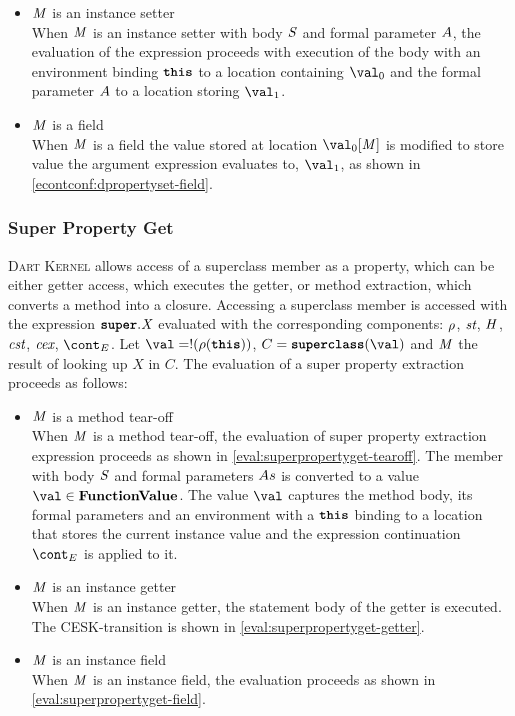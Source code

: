 \documentclass[a4paper,oneside,fleqn]{article}
\newcommand{\kernel}{\textsc{Dart Kernel}}
\newcommand{\synt}[1]{\ensuremath{\text{\textbf{\texttt{#1}}}}}
\DeclareMathOperator{\superclass}{\synt{superclass}}
\newcommand{\this}{\synt{this}}
\newcommand{\dfunval}{\mathbf{FunctionValue}}
\newcommand{\idmeta}{\ensuremath{\mathit{X}}}
\begin{document}
\begin{itemize}
    \item $\mathit{M}$ is an instance setter\\
        When $\mathit{M}$ is an instance setter with body $\mathit{S}$ and formal parameter $A$, the evaluation of the expression proceeds with execution of the body with an environment binding $\this$ to a location containing $\val_0$ and the formal parameter $A$ to a location storing $\val_1$.

    \item $\mathit{M}$ is a field\\
        When $\mathit{M}$ is a field the value stored at location $\val_0[\membermeta]$ is modified to store value the argument expression evaluates to, $\val_1$, as shown in \eqref{econtconf:dpropertyset-field}.

\end{itemize}


\subsubsection{Super Property Get}
\label{subsubsec:super-property-get}

\kernel{} allows access of a superclass member as a property, which can be either getter access, which executes the getter, or method extraction, which converts a method into a closure.
Accessing a superclass member is accessed with the expression $\SuperPropertyGet{\idmeta}$ evaluated with the corresponding components: $\rho$, $\textit{st}$, $\mathit{H}$, $\textit{cst}$, $\textit{cex}$, $\econt$.
Let $\val = \deref{(\env(\this))}$, $C = \superclass(\val)$ and $\mathit{M}$ the result of looking up $\idmeta$ in $C$.
The evaluation of a super property extraction proceeds as follows:

\begin{itemize}
    \item $\mathit{M}$ is a method tear-off\\
        When $\mathit{M}$ is a method tear-off, the evaluation of super property extraction expression proceeds as shown in \eqref{eval:superpropertyget-tearoff}.
        The member with body $\mathit{S}$ and formal parameters $As$ is converted to a value $\val \in \dfunval$.
        The value $\val$ captures the method body, its formal parameters and an environment with a $\this$ binding to a location that stores the current instance value and the expression continuation $\econt$ is applied to it.

    \item $\mathit{M}$ is an instance getter\\
        When $\mathit{M}$ is an instance getter, the statement body of the getter is executed.
        The CESK-transition is shown in \eqref{eval:superpropertyget-getter}.

    \item $\mathit{M}$ is an instance field\\
        When $\mathit{M}$ is an instance field, the evaluation proceeds as shown in \eqref{eval:superpropertyget-field}.

\end{itemize}
\end{document}
